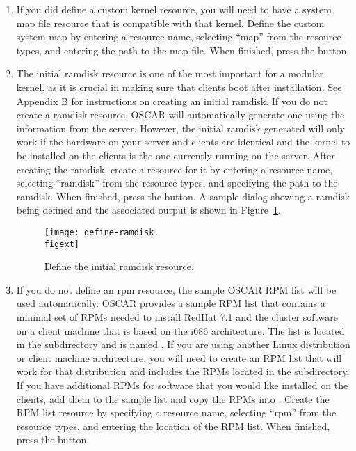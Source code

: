 \begin{enumerate}
\item {}  If you did define a custom kernel resource, you will
  need to have a system map file resource that is compatible with that
  kernel. Define the custom system map by entering a resource name,
  selecting ``map'' from the resource types, and entering the path to
  the map file. When finished, press the  button.
    
\item {} The initial ramdisk resource is
  one of the most important for a modular kernel, as it is crucial in
  making sure that clients boot after installation. See Appendix B for
  instructions on creating an initial ramdisk. If you do not create a
  ramdisk resource, OSCAR will automatically generate one using the
  information from the server. However, the initial ramdisk generated
  will only work if the hardware on your server and clients are
  identical and the kernel to be installed on the clients is the one
  currently running on the server. After creating the ramdisk, create
  a resource for it by entering a resource name, selecting ``ramdisk''
  from the resource types, and specifying the path to the ramdisk.
  When finished, press the  button. A sample dialog
  showing a ramdisk being defined and the associated output is shown
  in Figure~\ref{fig:detailed-define-initial-ramdisk-resource}.

  \begin{figure}[htbp]
    \begin{center}
      \texttt{[image: define-ramdisk.\\figext]}
      \caption{Define the initial ramdisk resource.}
      \label{fig:detailed-define-initial-ramdisk-resource}
    \end{center}
  \end{figure}
    
\item {} If you do not define an
  rpm resource, the sample OSCAR RPM list will be used automatically.
  OSCAR provides a sample RPM list that contains a minimal set of RPMs
  needed to install RedHat 7.1 and the cluster software on a client
  machine that is based on the i686 architecture. The list is located
  in the  subdirectory and is named
  . If you are using another Linux distribution
  or client machine architecture, you will need to create an RPM list
  that will work for that distribution and includes the RPMs located
  in the  subdirectory. If you have additional RPMs for
  software that you would like installed on the clients, add them to
  the sample list and copy the RPMs into . Create
  the RPM list resource by specifying a resource name, selecting
  ``rpm'' from the resource types, and entering the location of the
  RPM list. When finished, press the  button.
    \label{sec:detailed-define-rpm-list}
  \end{enumerate}
  
